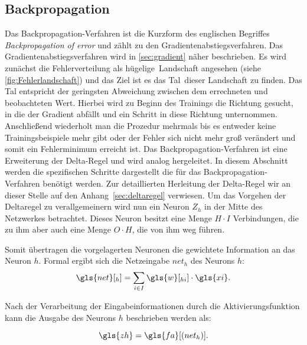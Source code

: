 \subsection{Backpropagation}\label{sec:Backpropagation}
Das Backpropagation-Verfahren ist die Kurzform des englischen Begriffes \textit{Backpropagation of error} und zählt zu den Gradientenabstiegsverfahren. Das Gradientenabstiegsverfahren wird in \autoref{sec:gradient} näher beschrieben. Es wird zunächst die Fehlerverteilung als \glqq hügelige\grqq~Landschaft angesehen (siehe \autoref{fig:Fehlerlandschaft}) und das Ziel ist es das \glqq Tal\grqq~dieser Landschaft zu finden. Das Tal entspricht der geringsten Abweichung zwischen dem errechneten und beobachteten Wert. Hierbei wird zu Beginn des Trainings die Richtung gesucht, in die der Gradient abfällt und ein Schritt in diese Richtung unternommen. Anschließend wiederholt man die Prozedur mehrmals bis es entweder keine Trainingsbeispiele mehr gibt oder der Fehler sich nicht mehr groß verändert und somit ein Fehlerminimum erreicht ist. Das Backpropagation-Verfahren ist eine Erweiterung der Delta-Regel und wird analog hergeleitet. In diesem Abschnitt werden die spezifischen Schritte dargestellt die für das Backpropagation-Verfahren benötigt werden. Zur detaillierten Herleitung der Delta-Regel wir an dieser Stelle auf den Anhang~\ref{sec:deltaregel} verwiesen.
Um das Vorgehen der Deltaregel zu verallgemeinern wird nun ein Neuron $Z_h$ in der Mitte des Netzwerkes betrachtet. Dieses Neuron besitzt eine Menge $H \cdot I$ Verbindungen, die zu ihm aber auch eine Menge $O \cdot H$, die von ihm weg führen.

\newpage

Somit übertragen die vorgelagerten Neuronen die gewichtete Information an das Neuron $h$. Formal ergibt sich die Netzeingabe $net_{h}$ des Neurons $h$:
\begin{equation}
\gls{net}[_{h}] = \sum_{i \in I} \gls{w}[_{hi}] \cdot \gls{xi} .
\label{gl:neth}
\end{equation}

Nach der Verarbeitung der Eingabeinformationen durch die Aktivierungsfunktion kann die Ausgabe des Neurons $h$ beschrieben werden als:

\begin{equation}
\gls{zh}= \gls{fa}[(net_{h})] . %
\label{gl:aktiv}
\end{equation}

